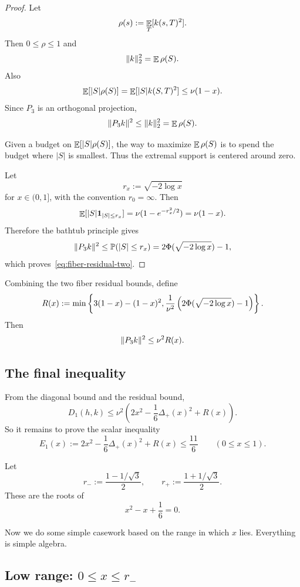 \begin{proof}
Let
\[
        \rho(s):=\mathop{\mathbb{E}}_T[k(s,T)^2].
\]
Then $0\le\rho\le1$ and
\[
        \lVert k\rVert^2_2=\mathop{\mathbb{E}}\rho(S).
\]
Also
\[
        \mathop{\mathbb{E}}[|S|\rho(S)]=\mathop{\mathbb{E}}[|S|k(S,T)^2]\le \nu(1-x).
\]
Since $P_3$ is an orthogonal projection,
\[
        \lVert P_3k\rVert^2\le \lVert k\rVert^2_2=\mathop{\mathbb{E}}\rho(S).
\]

Given a budget on $\mathop{\mathbb{E}}[|S|\rho(S)]$, the way to maximize $\mathop{\mathbb{E}}\rho(S)$ is to spend the budget where $|S|$ is smallest. Thus the extremal support is centered around zero.

Let
\[
        r_x:=\sqrt{-2\log x}
\]
for $x\in(0,1]$, with the convention $r_0=\infty$. Then
\[
        \mathop{\mathbb{E}}[|S|\mathbf 1_{|S|\le r_x}]=\nu(1-e^{-r_x^2/2})=\nu(1-x).
\]
Therefore the bathtub principle gives
\[
        \lVert P_3k\rVert^2
        \le
        \mathbb P(|S|\le r_x)
        =2\Phi(\sqrt{-2\log x})-1,
\]
which proves~\eqref{eq:fiber-residual-two}.
\end{proof}

Combining the two fiber residual bounds, define
\begin{equation}
        R(x):=
        \min\left\{
        3(1-x)-(1-x)^2,
        \frac{1}{\nu^2}\left(2\Phi(\sqrt{-2\log x})-1\right)
        \right\}.
        \label{eq:residual-function}
\end{equation}
Then
\[
        \lVert P_3k\rVert^2\le \nu^2R(x).
\]

\subsection{The final inequality}
\label{sec:putting-together}

From the diagonal bound and the residual bound,
\[
        D_1(h,k)
        \le
        \nu^2\left(2x^2-\frac16\Delta_+(x)^2+R(x)\right).
\]
So it remains to prove the scalar inequality
\begin{equation}
        E_1(x):=2x^2-\frac16\Delta_+(x)^2+R(x)
        \le \frac{11}{6}
        \qquad(0\le x\le1).
        \label{eq:scalar-reduction}
\end{equation}

Let
\[
        r_-:=\frac{1-1/\sqrt3}{2},
        \qquad
        r_+:=\frac{1+1/\sqrt3}{2}.
\]
These are the roots of
\[
        x^2-x+\frac16=0.
\]

Now we do some simple casework based on the range in which $x$ lies. Everything is simple algebra.

\subsection*{Low range: $0\le x\le r_-$}

